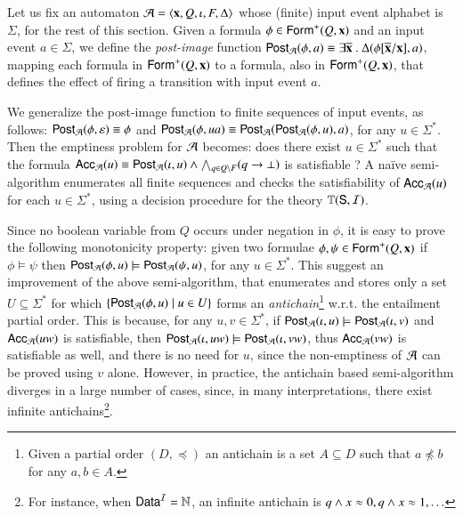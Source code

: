 \documentclass{llncs}
\begin{document}
Let us fix an automaton $\mathcal{A} = \left\langle \mathbf x,Q,\iota,F,\Delta \right\rangle$ whose
(finite) input event alphabet is $\Sigma$, for the rest of this
section. Given a formula $\phi \in \mathsf{Form}^+(Q,\mathbf x)$ and an input
event $a \in \Sigma$, we define the \emph{post-image} function
$\mathsf{Post}_{\mathcal{A}}(\phi,a) \equiv \exists \overline{\mathbf x} ~.~
\Delta(\phi[\overline{\mathbf x}/\mathbf x], a)$, mapping each formula in
$\mathsf{Form}^+(Q,\mathbf x)$ to a formula, also in $\mathsf{Form}^+(Q,\mathbf x)$, that
defines the effect of firing a transition with input event $a$. 

We generalize the post-image function to finite sequences of input
events, as follows: $\mathsf{Post}_{\mathcal{A}}(\phi,\varepsilon) \equiv \phi$ and
$\mathsf{Post}_{\mathcal{A}}(\phi,ua) \equiv \mathsf{Post}_{\mathcal{A}}(\mathsf{Post}_{\mathcal{A}}(\phi,u),a)$, for any $u
\in \Sigma^*$. Then the emptiness problem for $\mathcal{A}$ becomes: does there
exist $u \in \Sigma^*$ such that the formula $\mathsf{Acc}_{\mathcal{A}}(u) \equiv
\mathsf{Post}_{\mathcal{A}}(\iota,u) \wedge \bigwedge_{q \in Q \setminus F} (q
\rightarrow \bot)$ is satisfiable ? A na\"ive semi-algorithm
enumerates all finite sequences and checks the satisfiability of
$\mathsf{Acc}_{\mathcal{A}}(u)$ for each $u \in \Sigma^*$, using a decision procedure
for the theory $\mathbb{T}(\mathsf{S},\mathcal{I})$.

Since no boolean variable from $Q$ occurs under negation in $\phi$, it
is easy to prove the following monotonicity property: given two
formulae $\phi,\psi \in \mathsf{Form}^+(Q,\mathbf x)$ if $\phi \models \psi$
then $\mathsf{Post}_{\mathcal{A}}(\phi,u) \models \mathsf{Post}_{\mathcal{A}}(\psi,u)$, for any $u \in
\Sigma^*$. This suggest an improvement of the above semi-algorithm,
that enumerates and stores only a set $U \subseteq \Sigma^*$ for which
$\left\{ \mathsf{Post}_{\mathcal{A}}(\phi,u) \mid u \in U \right\}$ forms an
\emph{antichain}\footnote{Given a partial order $(D,\preceq)$ an
  antichain is a set $A \subseteq D$ such that $a \not\preceq b$ for
  any $a,b \in A$.} w.r.t. the entailment partial order. This is
because, for any $u,v \in \Sigma^*$, if $\mathsf{Post}_{\mathcal{A}}(\iota,u) \models
\mathsf{Post}_{\mathcal{A}}(\iota,v)$ and $\mathsf{Acc}_{\mathcal{A}}(uw)$ is satisfiable, then
$\mathsf{Post}_{\mathcal{A}}(\iota,uw) \models \mathsf{Post}_{\mathcal{A}}(\iota,vw)$, thus
$\mathsf{Acc}_{\mathcal{A}}(vw)$ is satisfiable as well, and there is no need for
$u$, since the non-emptiness of $\mathcal{A}$ can be proved using $v$
alone. However, in practice, the antichain based semi-algorithm
diverges in a large number of cases, since, in many interpretations,
there exist infinite antichains\footnote{For instance, when $\mathsf{Data}^{\mathcal{I}}
  = {\bf \mathbb{N}}$, an infinite antichain is $q \wedge x \approx 0, q \wedge x
  \approx 1, \ldots$}.
\end{document}
